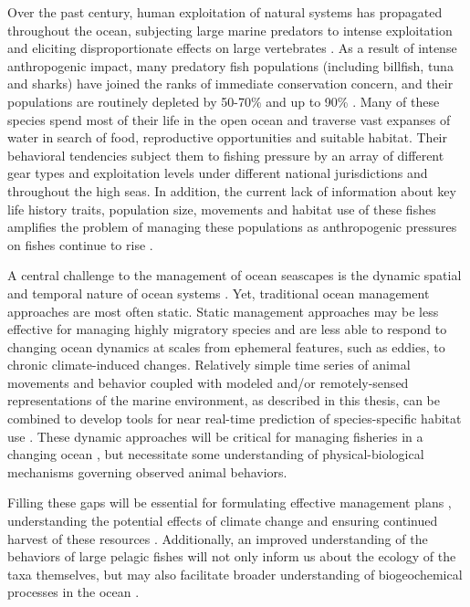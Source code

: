 Over the past century, human exploitation of natural systems has propagated throughout the ocean, subjecting large marine predators to intense exploitation \citep{Byrne2017} and eliciting disproportionate effects on large vertebrates \citep{Jackson2001, Baum2003}. As a result of intense anthropogenic impact, many predatory fish populations (including billfish, tuna and sharks) have joined the ranks of immediate conservation concern, and their populations are routinely depleted by 50-70\% \citep{Hilborn2003} and up to 90\% \citep{Myers2005}. Many of these species spend most of their life in the open ocean and traverse vast expanses of water in search of food, reproductive opportunities and suitable habitat. Their behavioral tendencies subject them to fishing pressure by an array of different gear types and exploitation levels under different national jurisdictions and throughout the high seas. In addition, the current lack of information about key life history traits, population size, movements and habitat use of these fishes amplifies the problem of managing these populations as anthropogenic pressures on fishes continue to rise \citep{Dulvy2008, Ferretti2010}.

A central challenge to the management of ocean seascapes is the dynamic spatial and temporal nature of ocean systems \citep{Lewison2015}. Yet, traditional ocean management approaches are most often static. Static management approaches may be less effective for managing highly migratory species and are less able to respond to changing ocean dynamics at scales from ephemeral features, such as eddies, to chronic climate-induced changes. Relatively simple time series of animal movements and behavior coupled with modeled and/or remotely-sensed representations of the marine environment, as described in this thesis, can be combined to develop tools for near real-time prediction of species-specific habitat use \citep{Hazen2018, Brodie2018}. These dynamic approaches will be critical for managing fisheries in a changing ocean \citep{Maxwell2015}, but necessitate some understanding of physical-biological mechanisms governing observed animal behaviors.

Filling these gaps will be essential for formulating effective management plans \citep{Cullis-Suzuki2010}, understanding the potential effects of climate change \citep{Hazen2012} and ensuring continued harvest of these resources \citep{Pauly1998, Watson2013}. Additionally, an improved understanding of the behaviors of large pelagic fishes will not only inform us about the ecology of the taxa themselves, but may also facilitate broader understanding of biogeochemical processes in the ocean \citep{Lavery2010a, Roman2010}.

